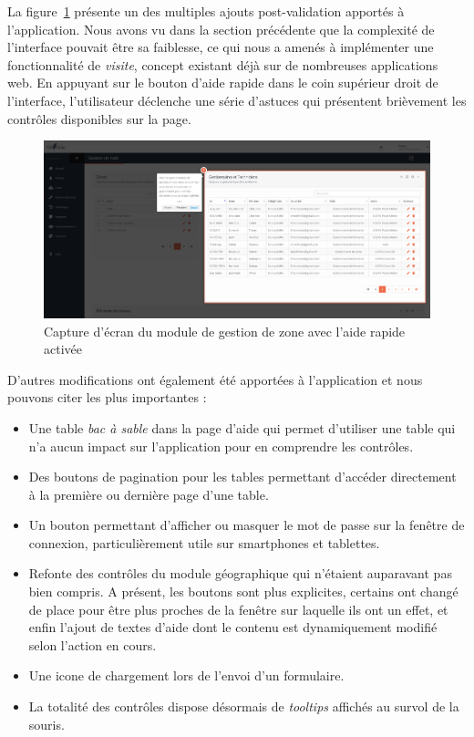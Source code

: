 \documentclass{EPL-master-thesis-covers-FR}
\begin{document}
				La figure~\ref{fig:screen_zone_quick_help} présente un des multiples ajouts post-validation apportés à l'application. Nous avons vu dans la section précédente que la complexité de l'interface pouvait être sa faiblesse, ce qui nous a amenés à implémenter une fonctionnalité de \emph{visite}, concept existant déjà sur de nombreuses applications web. En appuyant sur le bouton d'aide rapide dans le coin supérieur droit de l'interface, l'utilisateur déclenche une série d'astuces qui présentent brièvement les contrôles disponibles sur la page.

				\begin{figure}[H]
					\includegraphics[width=\textwidth]{images/screen_zone_quick_help.png}
					\caption{Capture d'écran du module de gestion de zone avec l'aide rapide activée}
					\label{fig:screen_zone_quick_help}
				\end{figure}

				D'autres modifications ont également été apportées à l'application et nous pouvons citer les plus importantes :
				\begin{itemize}
					\item Une table \emph{bac à sable} dans la page d'aide qui permet d'utiliser une table qui n'a aucun impact sur l'application pour en comprendre les contrôles.
					\item Des boutons de pagination pour les tables permettant d'accéder directement à la première ou dernière page d'une table.
					\item Un bouton permettant d'afficher ou masquer le mot de passe sur la fenêtre de connexion, particulièrement utile sur smartphones et tablettes.
					\item Refonte des contrôles du module géographique qui n'étaient auparavant pas bien compris. A présent, les boutons sont plus explicites, certains ont changé de place pour être plus proches de la fenêtre sur laquelle ils ont un effet, et enfin l'ajout de textes d'aide dont le contenu est dynamiquement modifié selon l'action en cours.
					\item Une icone de chargement lors de l'envoi d'un formulaire.
					\item La totalité des contrôles dispose désormais de \emph{tooltips} affichés au survol de la souris.
				\end{itemize}
\end{document}
